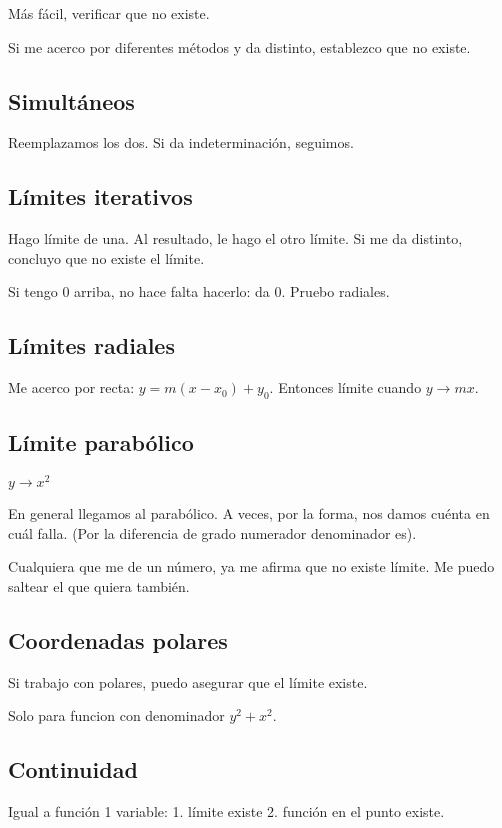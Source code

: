 Más fácil, verificar que no existe.

Si me acerco por diferentes métodos y da distinto, establezco que no existe.

\subsection{Simultáneos}

Reemplazamos los dos.
Si da indeterminación, seguimos.

\subsection{Límites iterativos}

Hago límite de una. Al resultado, le hago el otro límite.
Si me da distinto, concluyo que no existe el límite.

Si tengo 0 arriba, no hace falta hacerlo: da 0.
Pruebo radiales.

\subsection{Límites radiales}

Me acerco por recta: \(y = m(x-x_0) + y_0\).
Entonces límite cuando \(y \to mx\).

\subsection{Límite parabólico}

\(y \to x^2\)

En general llegamos al parabólico. A veces,
por la forma, nos damos cuénta en cuál falla.
(Por la diferencia de grado numerador denominador es).

Cualquiera que me de un número, ya me afirma que no existe límite.
Me puedo saltear el que quiera también.

\subsection{Coordenadas polares}

Si trabajo con polares,
puedo asegurar que el límite existe.

Solo para funcion con denominador \(y^2+x^2\).

\subsection{Continuidad}

Igual a función 1 variable: 1. límite existe 2. función en el punto existe.